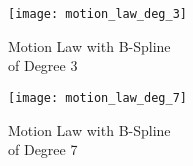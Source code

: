 	\begin{figure}[ht]
		\begin{minipage}{0.5\columnwidth}
			\texttt{[image: motion\_law\_deg\_3]}
			\caption{Motion Law with B-Spline\\\hspace{\textwidth} of Degree 3}
			\label{fig:motion_law_deg3}
		\end{minipage}%
		\begin{minipage}{0.5\columnwidth}
			\texttt{[image: motion\_law\_deg\_7]}
			\caption{Motion Law with B-Spline\\\hspace{\textwidth} of Degree 7}
			\label{fig:motion_law_deg7}
		\end{minipage}
	\end{figure}
